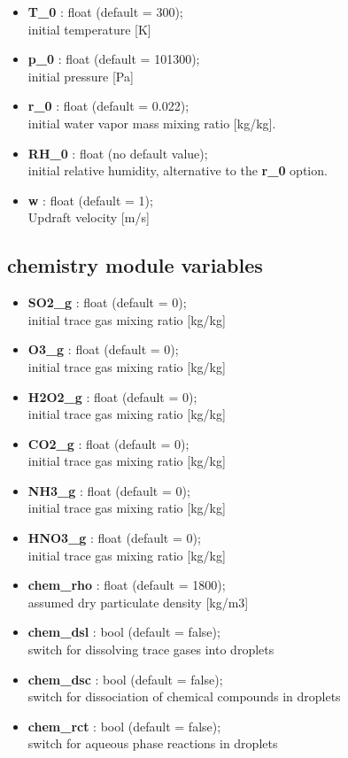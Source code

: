 \documentclass[11pt]{article}
\begin{document}
\begin{itemize}

  \item \textbf{T\_0}  : float (default = 300);\\ initial temperature [K]
  \item \textbf{p\_0}  : float (default = 101300);\\ initial pressure [Pa]
  \item \textbf{r\_0}  : float (default = 0.022);\\ initial water vapor mass mixing ratio [kg/kg].
  \item \textbf{RH\_0} : float (no default value);\\ initial relative humidity, alternative to the \textbf{r\_0} option.
  \item \textbf{w} : float (default = 1);\\ Updraft velocity [m/s]

\end{itemize}

\subsection{chemistry module variables}

\begin{itemize}

  \item \textbf{SO2\_g}    : float (default = 0); \\ initial  trace gas mixing ratio [kg/kg]
  \item \textbf{O3\_g}     : float (default = 0); \\ initial  trace gas mixing ratio [kg/kg]
  \item \textbf{H2O2\_g}   : float (default = 0); \\ initial  trace gas mixing ratio [kg/kg]
  \item \textbf{CO2\_g}    : float (default = 0); \\ initial  trace gas mixing ratio [kg/kg]
  \item \textbf{NH3\_g}    : float (default = 0); \\ initial  trace gas mixing ratio [kg/kg]
  \item \textbf{HNO3\_g}   : float (default = 0); \\ initial  trace gas mixing ratio [kg/kg]
  \item \textbf{chem\_rho} : float (default = 1800);  \\ assumed dry particulate density [kg/m3]
  \item \textbf{chem\_dsl} : bool  (default = false); \\ switch for dissolving trace gases into droplets
  \item \textbf{chem\_dsc} : bool  (default = false); \\ switch for dissociation of chemical compounds in droplets
  \item \textbf{chem\_rct} : bool  (default = false); \\ switch for aqueous phase reactions in droplets

\end{itemize}
\end{document}
